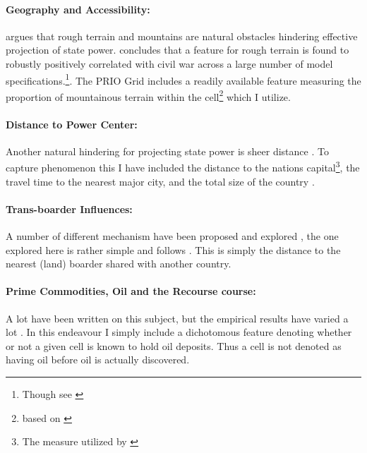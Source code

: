 \documentclass[a4paper]{article}
\begin{document}
\paragraph{Geography and Accessibility:} \cite{Fearon_Laitin_2003} argues that rough terrain and mountains are natural obstacles hindering effective projection of state power. \cite{Hegre_Sambanis_2006} concludes that a feature for rough terrain is found to robustly positively correlated with civil war across a large number of model specifications.\cite[526-529]{Hegre_Sambanis_2006}\footnote{Though see \cite{Goldstone_2010}}. The PRIO Grid includes a readily available feature measuring the proportion of mountainous terrain within the cell\footnote{based on \cite{Blyth_2002}} which I utilize.\par

\paragraph{Distance to Power Center:} Another natural hindering for projecting state power is sheer distance \citep{Fearon_2004, Buhaug_Gates_Lujala_2009, Cederman_Buhaug_Roed_2009, Buhaug_2010}. To capture phenomenon this I have included the distance to the nations capital\footnote{The measure utilized by \cite{Buhaug_2010}}, the travel time to the nearest major city, and the total size of the country \citep{prio_code_2015}.\par

\paragraph{Trans-boarder Influences:} A number of different mechanism have been proposed and explored \citep[29-30]{Blattman_Miguel_2010}, the one explored here is rather simple and follows \cite{Hegre_Sambanis_2006}. This is simply the distance to the nearest (land) boarder shared with another country.\par 

\paragraph{Prime Commodities, Oil and the Recourse course:} A lot have been written on this subject, but the empirical results have varied a lot \citep{Collier_Hoeffler_1998, Fearon_Laitin_2003, Fearon_2004, Ross_2004, Collier_Hoeffler_2004, Fearon_2005, Buhaug_2010, Hegre_Oestby_Raleigh_2009}. In this endeavour I simply include a dichotomous feature denoting whether or not a given cell is known to hold oil deposits. Thus a cell is not denoted as having oil before oil is actually discovered.\par
\end{document}
